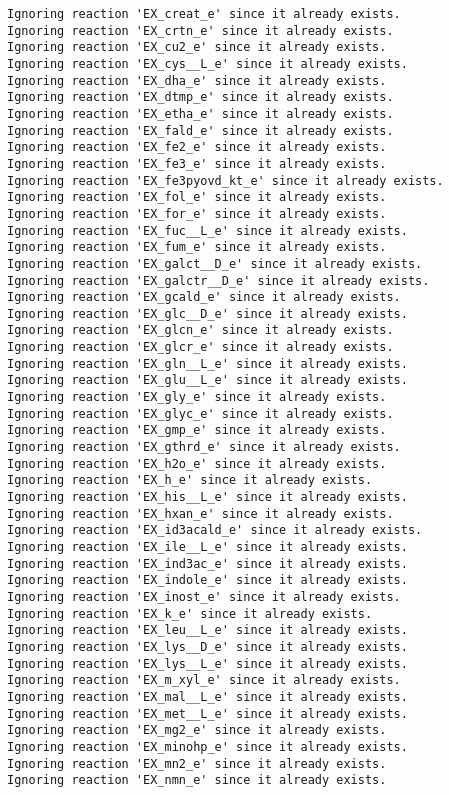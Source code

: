 \documentclass[
  letterpaper,
  DIV=11,
  numbers=noendperiod]{scrartcl}
\begin{document}
\begin{verbatim}
Ignoring reaction 'EX_creat_e' since it already exists.
Ignoring reaction 'EX_crtn_e' since it already exists.
Ignoring reaction 'EX_cu2_e' since it already exists.
Ignoring reaction 'EX_cys__L_e' since it already exists.
Ignoring reaction 'EX_dha_e' since it already exists.
Ignoring reaction 'EX_dtmp_e' since it already exists.
Ignoring reaction 'EX_etha_e' since it already exists.
Ignoring reaction 'EX_fald_e' since it already exists.
Ignoring reaction 'EX_fe2_e' since it already exists.
Ignoring reaction 'EX_fe3_e' since it already exists.
Ignoring reaction 'EX_fe3pyovd_kt_e' since it already exists.
Ignoring reaction 'EX_fol_e' since it already exists.
Ignoring reaction 'EX_for_e' since it already exists.
Ignoring reaction 'EX_fuc__L_e' since it already exists.
Ignoring reaction 'EX_fum_e' since it already exists.
Ignoring reaction 'EX_galct__D_e' since it already exists.
Ignoring reaction 'EX_galctr__D_e' since it already exists.
Ignoring reaction 'EX_gcald_e' since it already exists.
Ignoring reaction 'EX_glc__D_e' since it already exists.
Ignoring reaction 'EX_glcn_e' since it already exists.
Ignoring reaction 'EX_glcr_e' since it already exists.
Ignoring reaction 'EX_gln__L_e' since it already exists.
Ignoring reaction 'EX_glu__L_e' since it already exists.
Ignoring reaction 'EX_gly_e' since it already exists.
Ignoring reaction 'EX_glyc_e' since it already exists.
Ignoring reaction 'EX_gmp_e' since it already exists.
Ignoring reaction 'EX_gthrd_e' since it already exists.
Ignoring reaction 'EX_h2o_e' since it already exists.
Ignoring reaction 'EX_h_e' since it already exists.
Ignoring reaction 'EX_his__L_e' since it already exists.
Ignoring reaction 'EX_hxan_e' since it already exists.
Ignoring reaction 'EX_id3acald_e' since it already exists.
Ignoring reaction 'EX_ile__L_e' since it already exists.
Ignoring reaction 'EX_ind3ac_e' since it already exists.
Ignoring reaction 'EX_indole_e' since it already exists.
Ignoring reaction 'EX_inost_e' since it already exists.
Ignoring reaction 'EX_k_e' since it already exists.
Ignoring reaction 'EX_leu__L_e' since it already exists.
Ignoring reaction 'EX_lys__D_e' since it already exists.
Ignoring reaction 'EX_lys__L_e' since it already exists.
Ignoring reaction 'EX_m_xyl_e' since it already exists.
Ignoring reaction 'EX_mal__L_e' since it already exists.
Ignoring reaction 'EX_met__L_e' since it already exists.
Ignoring reaction 'EX_mg2_e' since it already exists.
Ignoring reaction 'EX_minohp_e' since it already exists.
Ignoring reaction 'EX_mn2_e' since it already exists.
Ignoring reaction 'EX_nmn_e' since it already exists.

\end{verbatim}
\end{document}
